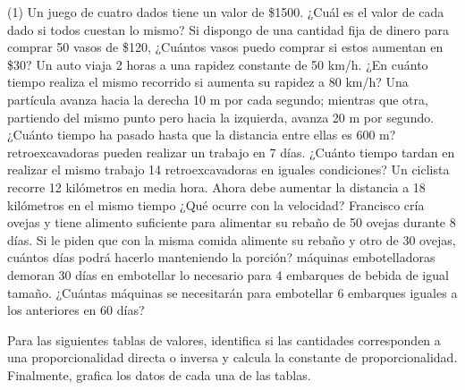 \documentclass[]{plantilla-material-v1}
\begin{document}
\begin{ejercicios}(1)
  \ejercicio Un juego de cuatro dados tiene un valor de \$1500. ¿Cuál es el valor
  de cada dado si todos cuestan lo mismo? 
  \ejercicio Si dispongo de una cantidad fija de dinero para comprar 50 vasos
  de \$120, ¿Cuántos vasos puedo comprar si estos aumentan en \$30?
  \ejercicio Un auto viaja 2 horas a una rapidez constante de 50 km/h. ¿En cuánto
  tiempo realiza el mismo recorrido si aumenta su rapidez a 80 km/h?
  \ejercicio Una partícula avanza hacia la derecha 10 m por cada segundo; mientras que 
  otra, partiendo del mismo punto pero hacia la izquierda, avanza 20 m por segundo.
  ¿Cuánto tiempo ha pasado hasta que la distancia entre ellas es 600 m?
   retroexcavadoras pueden realizar un trabajo en 7 días. ¿Cuánto tiempo
  tardan en realizar el mismo trabajo 14 retroexcavadoras en iguales condiciones?
  \ejercicio Un ciclista recorre 12 kilómetros en media hora. Ahora debe aumentar 
  la distancia a 18 kilómetros en el mismo tiempo ¿Qué ocurre con la velocidad?
  \ejercicio Francisco cría ovejas y tiene alimento suficiente para alimentar su rebaño
  de 50 ovejas durante 8 días. Si le piden que con la misma comida alimente su rebaño
  y otro de 30 ovejas, cuántos días podrá hacerlo manteniendo la porción?
   máquinas embotelladoras demoran 30 días en embotellar lo necesario 
  para 4 embarques de bebida de igual tamaño. ¿Cuántas máquinas se necesitarán para 
  embotellar 6 embarques iguales a los anteriores en 60 días?
\end{ejercicios}

Para las siguientes tablas de valores, identifica si las cantidades corresponden 
a una proporcionalidad directa o inversa y calcula la constante de proporcionalidad. 
Finalmente, grafica los datos de cada una de las tablas.
\end{document}

